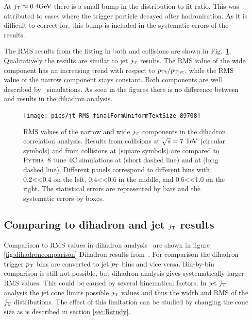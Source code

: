 At $j_{\rm T} \approx 0.4 \mathrm{GeV}\kern-0.05em$ there is a small bump in the distribution to fit ratio. This was attributed to cases where the trigger particle decayed after hadronisation. As it is difficult to correct for, this bump is included in the systematic errors of the results.  


The RMS results from the fitting in both \pp and \pPb collisions are shown in Fig.~\ref{fig:dihadronResults}. Qualitatively the results are similar to jet $j_{\rm T}$ results. The RMS value of the wide component has an increasing trend with respect to $p_{\rm Tt}/p_{\rm Tjet}$, while the RMS value of the narrow component stays constant. Both components are well described by \pythia~simulations. As seen in the figures there is no difference between \pp and \pPb results in the dihadron analysis. 



\begin{figure}[htb]
\centering
\texttt{[image: pics/jt\_RMS\_finalFormUniformTextSize-89708]}
\caption{RMS values of the narrow and wide $j_{\rm T}$ components in the dihadron correlation analysis. Results from \pp collisions at $\sqrt{s} = 7 \mbox{~TeV}$ (circular symbols) and from \pPb collisions at  (square symbols) are compared to \textsc{Pythia}~8 tune 4C simulations at  (short dashed line) and at  (long dashed line). Different panels correspond to different \xlong bins with 0.2<\xlong<0.4 on the left, 0.4<\xlong<0.6 in the middle, and 0.6<\xlong<1.0 on the right. The statistical errors are represented by bars and the systematic errors by boxes.~\cite{ALICEjt}}
\label{fig:dihadronResults}
\end{figure}


\subsection{Comparing to dihadron and jet $j_{\rm T}$ results}
Comparison to RMS values in dihadron analysis~\cite{jussi} are shown in figure \ref{fig:dihadroncomparison} Dihadron results from~\cite{jussi}. For comparison the dihadron trigger $p_{\rm T}$ bins are converted to jet $p_{\rm T}$ bins and vice versa. Bin-by-bin comparison is still not possible, but dihadron analysis gives systematically larger RMS values. This could be caused by several kinematical factors. In jet $j_{\rm T}$ analysis the jet cone limits possible $j_{\rm T}$ values and thus the width and RMS of the $j_{\rm T}$ distributions. The effect of this limitation can be studied by changing the cone size as is described in section \ref{sec:Rstudy}. 

